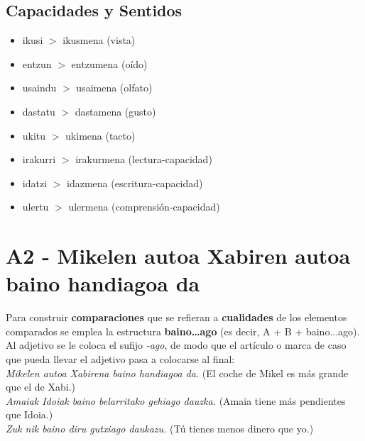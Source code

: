 \documentclass[11pt, a4paper]{article}
\begin{document}
\subsection{Capacidades y Sentidos}
\begin{multicols}{2}
\begin{itemize}
\item ikusi $>$ ikusmena (vista)
\item entzun $>$ entzumena (oído)
\item usaindu $>$ usaimena (olfato)
\item dastatu $>$ dastamena (gusto)
\item ukitu $>$ ukimena (tacto)
\item irakurri $>$ irakurmena (lectura-capacidad)
\item idatzi $>$ idazmena (escritura-capacidad)
\item ulertu $>$ ulermena (comprensión-capacidad)
\end{itemize}
\end{multicols}

\section{A2 - Mikelen autoa Xabiren autoa baino handiagoa da}
\noindent Para construir \textbf{comparaciones} que se refieran a \textbf{cualidades} de los elementos comparados se emplea la estructura \textbf{baino…ago} (es decir, A + B + baino...ago). Al adjetivo se le coloca el sufijo \textit{-ago}, de modo que el artículo o marca de caso que pueda llevar el adjetivo pasa a colocarse al final:\\
\indent \textit{Mikelen autoa Xabirena baino handiagoa da.}
(El coche de Mikel es más grande que el de Xabi.)\\
\indent \textit{Amaiak Idoiak baino belarritako gehiago dauzka.}
(Amaia tiene más pendientes que Idoia.)\\
\indent \textit{Zuk nik baino diru gutxiago daukazu.}
(Tú tienes menos dinero que yo.)\\
\end{document}
